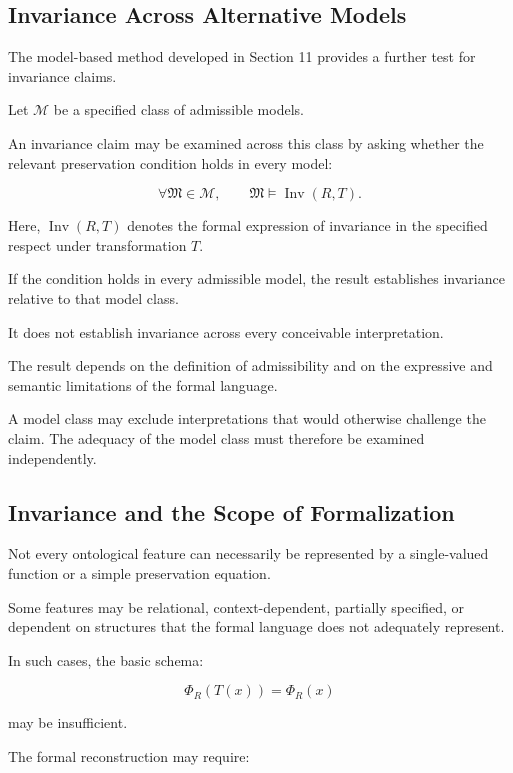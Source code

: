 \subsection{Invariance Across Alternative Models}

The model-based method developed in Section 11
provides a further test for invariance claims.

Let \(\mathcal{M}\) be a specified class of
admissible models.

An invariance claim may be examined across
this class by asking whether the relevant
preservation condition holds in every model:

\[
    \forall \mathfrak{M} \in \mathcal{M},
    \qquad
    \mathfrak{M} \models \operatorname{Inv}(R,T).
\]

Here, \(\operatorname{Inv}(R,T)\) denotes
the formal expression of invariance in the
specified respect under transformation \(T\).

If the condition holds in every admissible
model, the result establishes invariance
relative to that model class.

It does not establish invariance across
every conceivable interpretation.

The result depends on the definition of
admissibility and on the expressive and
semantic limitations of the formal language.

A model class may exclude interpretations
that would otherwise challenge the claim.
The adequacy of the model class must therefore
be examined independently.

\subsection{Invariance and the Scope of Formalization}

Not every ontological feature can necessarily
be represented by a single-valued function
or a simple preservation equation.

Some features may be relational, context-dependent,
partially specified, or dependent on structures
that the formal language does not adequately
represent.

In such cases, the basic schema:

\[
    \Phi_R(T(x)) = \Phi_R(x)
\]

may be insufficient.

The formal reconstruction may require:

